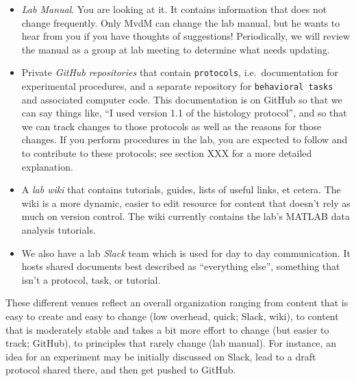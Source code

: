 \documentclass{tufte-book}
\newcommand{\doccls}[1]{\texttt{#1}}%
\begin{document}
\begin{itemize}
\item{{\it Lab Manual}. You are looking at it. It contains information
  that does not change frequently. Only MvdM can change the lab
  manual, but he wants to hear from you if you have thoughts of
  suggestions! Periodically, we will review the manual as a group at
  lab meeting to determine what needs updating.}
\item{Private {\it GitHub
    repositories} that contain \doccls{protocols},
  i.e.\ documentation for experimental procedures, and a separate repository for
  \doccls{behavioral tasks} and associated computer
  code. This documentation is on GitHub
  so that we can say things like, ``I used version 1.1 of the histology
  protocol'', and so that we can track changes to those protocols as
  well as the reasons for those changes. If you perform procedures in
  the lab, you are expected to follow and to contribute to these
  protocols; see section XXX for a more detailed explanation.}
\item{A {\it lab
    wiki} that
  contains tutorials, guides, lists of useful links, et cetera. The
  wiki is a more dynamic, easier to edit resource for content that
  doesn't rely as much on version control. The wiki currently contains
  the lab's MATLAB data analysis tutorials.}
\item{We also have a lab {\it Slack}
  team which is used for day to day
  communication. It hosts shared documents best described as
  ``everything else'', something that isn't a protocol, task, or
  tutorial.}
\end{itemize}

These different venues reflect an overall organization ranging from
content that is easy to create and easy to change (low overhead,
quick; Slack, wiki), to content that is moderately stable and takes a
bit more effort to change (but easier to track; GitHub), to principles
that rarely change (lab manual). For instance, an idea for an
experiment may be initially discussed on Slack, lead to a draft
protocol shared there, and then get pushed to GitHub. 
\end{document}
